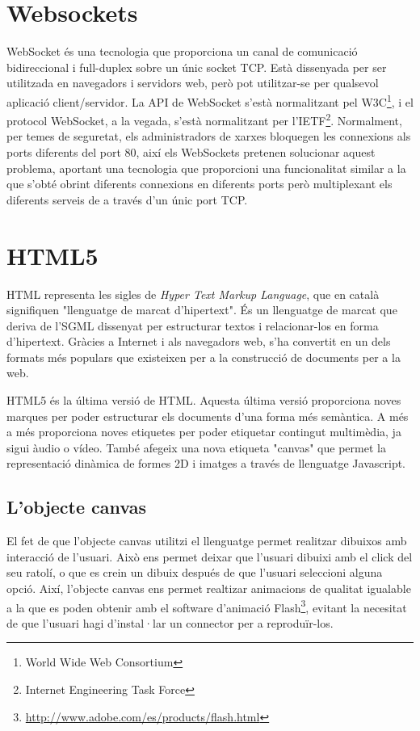 \section{Websockets}
\label{sec:websockets}

WebSocket és una tecnologia que proporciona un canal de comunicació bidireccional i full-duplex sobre un únic socket TCP. Està dissenyada per ser utilitzada en navegadors i servidors web, però pot utilitzar-se per qualsevol aplicació client/servidor. La API de WebSocket s'està normalitzant pel W3C\footnote{World Wide Web Consortium}, i el protocol WebSocket, a la vegada, s'està normalitzant per l'IETF\footnote{Internet Engineering Task Force}. Normalment, per temes de seguretat, els administradors de xarxes bloquegen les connexions als ports diferents del port 80, així els WebSockets pretenen solucionar aquest problema, aportant una tecnologia que proporcioni una funcionalitat similar a la que s'obté obrint diferents connexions en diferents ports però multiplexant els diferents serveis de a través d'un únic port TCP.

\section{HTML5}

HTML representa les sigles de \emph{Hyper Text Markup Language}, que en català signifiquen "llenguatge de marcat d'hipertext". És un llenguatge de marcat que deriva de l'SGML dissenyat per estructurar textos i relacionar-los en forma d'hipertext. Gràcies a Internet i als navegadors web, s'ha convertit en un dels formats més populars que existeixen per a la construcció de documents per a la web. 

HTML5 és la última versió de HTML. Aquesta última versió proporciona noves marques per poder estructurar els documents d'una forma més semàntica. A més a més proporciona noves etiquetes per poder etiquetar contingut multimèdia, ja sigui àudio o vídeo. També afegeix una nova etiqueta "canvas" que permet la representació dinàmica de formes 2D i imatges a través de llenguatge Javascript. 

\subsection{L'objecte canvas}

El fet de que l'objecte canvas utilitzi el llenguatge permet realitzar dibuixos amb interacció de l'usuari. Això ens permet deixar que l'usuari dibuixi amb el click del seu ratolí, o que es crein un dibuix después de que l'usuari seleccioni alguna opció. Així, l'objecte canvas ens permet realtizar animacions de qualitat igualable a la que es poden obtenir amb el software d'animació Flash\footnote{\url{http://www.adobe.com/es/products/flash.html}}, evitant la necesitat de que l'usuari hagi d'instal·lar un connector per a reproduïr-los. 

